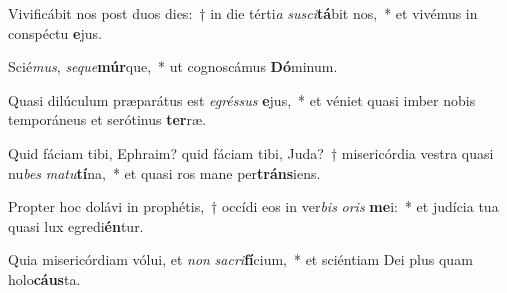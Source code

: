 \item Vivificábit nos post duos dies:~† in die térti\textit{a} \textit{su}\textit{sci}\textbf{tá}bit nos,~* et vivémus in conspéctu \textbf{e}jus.
\item Scié\textit{mus}, \textit{se}\textit{que}\textbf{múr}que,~* ut cognoscámus \textbf{Dó}minum.
\item Quasi dilúculum præparátus est \textit{e}\textit{grés}\textit{sus} \textbf{e}jus,~* et véniet quasi imber nobis temporáneus et serótinus \textbf{ter}ræ.
\item Quid fáciam tibi, Ephraim? quid fáciam tibi, Juda?~† misericórdia vestra quasi nu\textit{bes} \textit{ma}\textit{tu}\textbf{tí}na,~* et quasi ros mane per\textbf{tráns}iens.
\item Propter hoc dolávi in prophétis,~† occídi eos in ver\textit{bis} \textit{o}\textit{ris} \textbf{me}i:~* et judícia tua quasi lux egredi\textbf{én}tur.
\item Quia misericórdiam vólui, et \textit{non} \textit{sa}\textit{cri}\textbf{fí}cium,~* et sciéntiam Dei plus quam holo\textbf{cáus}ta.
